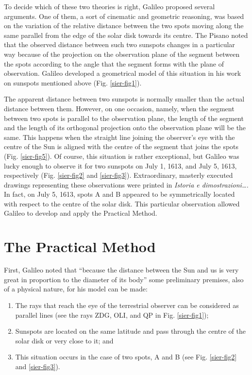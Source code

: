 \begin{artengenv}
To decide which of these two theories is right, Galileo proposed several arguments. One of them, a sort of cinematic and
geometric reasoning, was based on the variation of the relative distance between the two spots moving along the same
parallel from the edge of the solar disk towards its centre. The Pisano noted that the observed distance between such
two sunspots changes in a particular way because of the projection on the observation plane of the segment between the
spots according to the angle that the segment forms with the plane of observation. Galileo developed a geometrical
model of this situation in his work on sunspots mentioned above (Fig. \ref{sier-fig1}). 

The apparent distance between two sunspots is normally smaller than the actual distance between them. However, on one
occasion, namely, when the segment between two spots is parallel to the observation plane, the length of the segment
and the length of its orthogonal projection onto the observation plane will be the same. This happens when the straight
line joining the observer’s eye with the centre of the Sun is aligned with the centre of the segment that joins the
spots (Fig. \ref{sier-fig5}). Of course, this situation is rather exceptional, but Galileo was lucky enough to observe it for two
sunspots on July 1, 1613, and July 5, 1613, respectively (Fig. \ref{sier-fig2} and \ref{sier-fig3}). Extraordinary, masterly executed drawings
representing these observations were printed in \textit{Istoria e dimostrazioni\ldots. }In fact, on July 5, 1613, spots A
and B appeared to be symmetrically located with respect to the centre of the solar disk. This particular observation
allowed Galileo to develop and apply the Practical Method. 

\section{The Practical Method}

First, Galileo noted that ``because the distance between the Sun and us is very great in proportion to the diameter of
its body''
\parencite[see  V, 121.5;][p.112]{galilei_sunspots_2010}
some preliminary premises, also of a physical
nature, for his model can be made: 

\begin{enumerate}
	\item The rays that reach the eye of the terrestrial observer can be considered as parallel lines (see the rays ZDG, OLI,
	and QP in Fig. \ref{sier-fig1});
	\item Sunspots are located on the same latitude and pass through the centre of the solar disk or very close to it; and
	\item This situation occurs in the case of two spots, A and B (see Fig. \ref{sier-fig2} and \ref{sier-fig3}).
\end{enumerate}


\end{artengenv}
